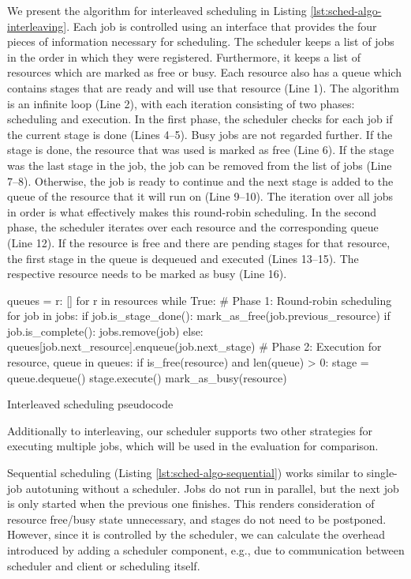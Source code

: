 We present the algorithm for interleaved scheduling in Listing \ref{lst:sched-algo-interleaving}. Each job is controlled using an interface that provides the four pieces of information necessary for scheduling. The scheduler keeps a list of jobs in the order in which they were registered. Furthermore, it keeps a list of resources which are marked as free or busy. Each resource also has a queue which contains stages that are ready and will use that resource (Line 1). The algorithm is an infinite loop (Line 2), with each iteration consisting of two phases: scheduling and execution. In the first phase, the scheduler checks for each job if the current stage is done (Lines 4--5). Busy jobs are not regarded further. If the stage is done, the resource that was used is marked as free (Line 6). If the stage was the last stage in the job, the job can be removed from the list of jobs (Line 7--8). Otherwise, the job is ready to continue and the next stage is added to the queue of the resource that it will run on (Line 9--10). The iteration over all jobs in order is what effectively makes this round-robin scheduling. In the second phase, the scheduler iterates over each resource and the corresponding queue (Line 12). If the resource is free and there are pending stages for that resource, the first stage in the queue is dequeued and executed (Lines 13--15). The respective resource needs to be marked as busy (Line 16).

\begin{listing}
\begin{pythoncode}
queues = {r: [] for r in resources}
while True:
    # Phase 1: Round-robin scheduling
    for job in jobs:
        if job.is_stage_done():
            mark_as_free(job.previous_resource)
            if job.is_complete():
                jobs.remove(job)
            else:
                queues[job.next_resource].enqueue(job.next_stage)
    # Phase 2: Execution
    for resource, queue in queues:
        if is_free(resource) and len(queue) > 0:
            stage = queue.dequeue()
            stage.execute()
            mark_as_busy(resource)
\end{pythoncode}
\unskip
\caption{Interleaved scheduling pseudocode}
\label{lst:sched-algo-interleaving}
\end{listing}

Additionally to interleaving, our scheduler supports two other strategies for executing multiple jobs, which will be used in the evaluation for comparison.

Sequential scheduling (Listing \ref{lst:sched-algo-sequential}) works similar to single-job autotuning without a scheduler. Jobs do not run in parallel, but the next job is only started when the previous one finishes. This renders consideration of resource free/busy state unnecessary, and stages do not need to be postponed. However, since it is controlled by the scheduler, we can calculate the overhead introduced by adding a scheduler component, e.g., due to communication between scheduler and client or scheduling itself.

